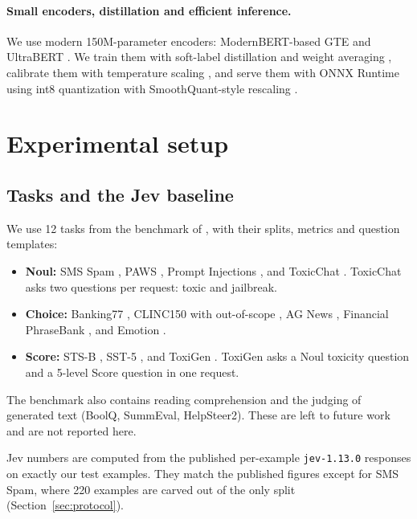 \documentclass[11pt]{article}
\begin{document}
\paragraph{Small encoders, distillation and efficient inference.}
We use modern 150M-parameter encoders: ModernBERT-based GTE \citep{warner2024modernbert,li2023gte} and UltraBERT \citep{dmis2026ultrabert}.
We train them with soft-label distillation \citep{hinton2015distilling} and weight averaging \citep{wortsman2022soups}, calibrate them with temperature scaling \citep{guo2017calibration}, and serve them with ONNX Runtime \citep{onnxruntime} using int8 quantization with SmoothQuant-style rescaling \citep{xiao2023smoothquant}.

\section{Experimental setup}\label{sec:setup}
\subsection{Tasks and the Jev baseline}
We use 12 tasks from the benchmark of \citet{deusser2026jev}, with their splits, metrics and question templates:
\begin{itemize}
  \item \textbf{Noul:} SMS Spam \citep{almeida2011contributions}, PAWS \citep{zhang2019paws}, Prompt Injections \citep{deepset2023promptinjections}, and ToxicChat \citep{lin2023toxicchat}. ToxicChat asks two questions per request: toxic and jailbreak.
  \item \textbf{Choice:} Banking77 \citep{casanueva2020efficient}, CLINC150 with out-of-scope \citep{larson2019evaluation}, AG News \citep{zhang2015character}, Financial PhraseBank \citep{malo2014good}, and Emotion \citep{saravia2018carer}.
  \item \textbf{Score:} STS-B \citep{cer2017semeval}, SST-5 \citep{socher2013recursive}, and ToxiGen \citep{hartvigsen2022toxigen}. ToxiGen asks a Noul toxicity question and a 5-level Score question in one request.
\end{itemize}
The benchmark also contains reading comprehension and the judging of generated text (BoolQ, SummEval, HelpSteer2). These are left to future work and are not reported here.

Jev numbers are computed from the published per-example \texttt{jev-1.13.0} responses on exactly our test examples.
They match the published figures except for SMS Spam, where 220 examples are carved out of the only split (Section~\ref{sec:protocol}).
\end{document}
